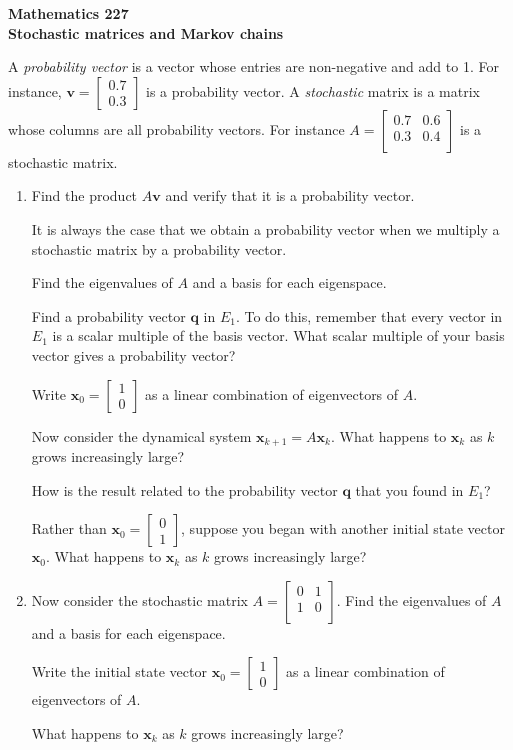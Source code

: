 \documentclass[12pt]{article}
\newcommand{\vs}[1]{\vspace{#1in}}
\newcommand{\qvec}{{\mathbf q}}
\newcommand{\vvec}{{\mathbf v}}
\newcommand{\xvec}{{\mathbf x}}
\newcommand{\twovec}[2]{\left[\begin{array}{r}#1 \\ #2
    \end{array}\right]}
\newcommand{\mattwo}[4]{\left[\begin{array}{rr}#1 & #2 \\ #3 & #4 \\ \end{array}\right]}
\begin{document}
\noindent
{\bf Mathematics 227} \\ 
{\bf Stochastic matrices and Markov chains}

\bigskip A {\em probability vector} is a vector whose entries are
non-negative and add to 1.  For instance,
$
\vvec = \twovec{0.7}{0.3}
$
is a probability vector.  A {\em stochastic} matrix is a matrix whose
columns are all probability vectors.  For instance
$
A = \mattwo{0.7}{0.6}{0.3}{0.4}
$
is a stochastic matrix.  

\begin{enumerate}
\item Find the product $A\vvec$ and verify that it is a probability
  vector.  

  \vs{1}
  It is always the case that we obtain a probability vector when we
  multiply a stochastic matrix by a probability vector.

  \medskip
  Find the eigenvalues of $A$ and a basis for each eigenspace.

  \vs{2}
  Find a probability vector $\qvec$ in $E_1$.  To do this,
  remember that 
  every vector in $E_1$ is a scalar multiple of the basis vector.
  What scalar multiple of your basis vector gives a probability vector?

  \vs{1}
  Write $\xvec_0=\twovec10$ as a linear combination of
  eigenvectors of $A$.

  \vs{1}
  \newpage
  Now consider the dynamical system $\xvec_{k+1} = A\xvec_k$.
  What happens to $\xvec_k$ as $k$ grows increasingly large?  

  \vs{1}
  How is the result related to the probability vector $\qvec$ that you
  found in $E_1$?

  \vs{1}
  Rather than $\xvec_0=\twovec01$, suppose you began with another
  initial state vector $\xvec_0$.  What happens to $\xvec_k$ as $k$
  grows increasingly large?

  \vs{1}
\item Now consider the stochastic matrix
$A = 
\left[
  \begin{array}{cc}
    0 & 1 \\
    1 & 0 \\
  \end{array}
\right]
$.  Find the eigenvalues of $A$ and a basis for each eigenspace.

\vs{1.5}
Write the initial state vector $\xvec_0 = \twovec10$ as a linear
combination of eigenvectors of $A$.

\vs{1}
What happens to $\xvec_k$ as $k$ grows increasingly large?

\end{enumerate}
\end{document}
